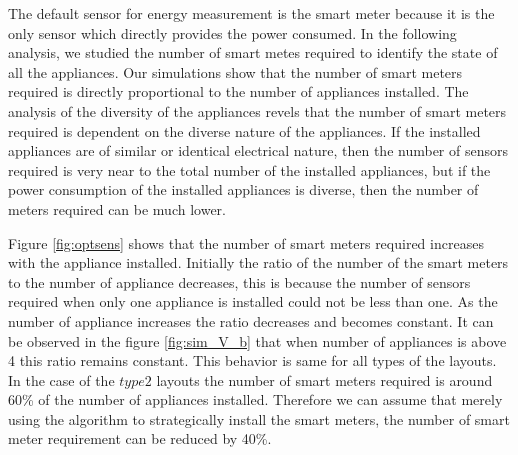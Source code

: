 The default sensor for energy measurement is the smart meter because it is the only sensor which directly provides the power consumed. In the following analysis, we studied the number of smart metes required to identify the state of all the appliances. Our simulations show that the number of smart meters required is directly proportional to the number of appliances installed. The analysis of the diversity of the appliances revels that the number of smart meters required is dependent on the diverse nature of the appliances. If the installed appliances are of similar or identical electrical nature, then the number of sensors required is very near to the total number of the installed appliances, but if the power consumption of the installed appliances is diverse, then the number of meters required can be much lower.

Figure \ref{fig:optsens} shows that the number of smart meters required increases with the appliance installed. Initially the ratio of the number of the smart meters to the number of appliance decreases, this is because the number of sensors required when only one appliance is installed could not be less than one. As the number of appliance increases the ratio decreases and becomes constant. It can be observed in the figure \ref{fig:sim_V_b} that when number of appliances is above 4 this ratio remains constant. This behavior is same for all types of the layouts. In the case of the $type 2$ layouts the number of smart meters required is around 60\% of the number of appliances installed. Therefore we can assume that merely using the algorithm to strategically install the smart meters, the number of smart meter requirement can be reduced by 40\%.
